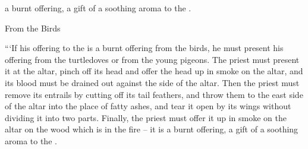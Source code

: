 {a burnt offering,
a gift
of a soothing
aroma
to the
{}.
\par }{\SH From the Birds
\par }{\PP {}“‘If
his offering
to the
{}
is a burnt offering
from
the birds,
he must present
his offering
from
the turtledoves
or
from
the young
pigeons.
The priest
must present
it at the altar,
pinch
off its head
and offer the head up in smoke
on the altar,
and its blood
must be drained
out against
the side
of the altar.
Then the priest must remove
its entrails
by cutting off its tail feathers,
and throw
them to the east
side
of the altar
into
the place
of fatty ashes,
and tear
it open by its wings
without
dividing
it into two parts. Finally, the priest
must offer it up in smoke
on
the altar
on
the wood
which
is in the fire
– it is a burnt offering,
a gift
of a soothing
aroma
to the
{}.

}
